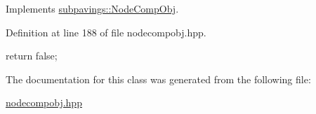 \-Implements \hyperlink{classsubpavings_1_1NodeCompObj_a121d53049c5ed1c0924313951d6aa630}{subpavings\-::\-Node\-Comp\-Obj}.



\-Definition at line 188 of file nodecompobj.\-hpp.


\begin{DoxyCode}
        {
            return false;
        }
\end{DoxyCode}


\-The documentation for this class was generated from the following file\-:\begin{DoxyCompactItemize}
\item 
\hyperlink{nodecompobj_8hpp}{nodecompobj.\-hpp}\end{DoxyCompactItemize}
